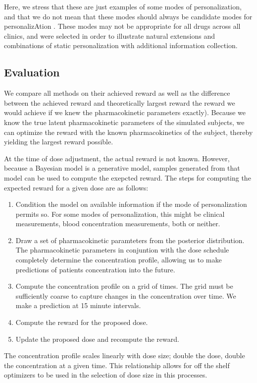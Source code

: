 Here, we stress that these are just examples of some modes of personalization, and that we do not mean that these modes should always be candidate modes for personalizAtion .  These modes may not be appropriate for all drugs across all clinics, and were selected in order to illustrate natural extensions and combinations of static personalization with additional information collection.

\subsection{Evaluation}

We compare all methods on their achieved reward as well as the difference between the achieved reward and theoretically largest reward the reward we would achieve if we knew the pharmacokinetic parameters exactly).  Because we know the true latent pharmacokinetic parameters of the simulated subjects, we can optimize the reward with the known pharmacokinetics of the subject, thereby yielding the largest reward possible.

At the time of dose adjustment, the actual reward is not known.  However, because a Bayesian model is a generative model, samples generated from that model can be used to compute the exepcted reward.  The steps for computing the expected reward for a given dose are as follows:

\begin{enumerate}
	\item Condition the model on available information if the mode of personalization permits so.  For some modes of personalization, this might be clinical measurements, blood concentration measurements, both or neither.
	
	\item Draw a set of pharmacokinetic paramteters from the posterior distribution. The pharmacokinetic parameters in conjuntion with the dose schedule completely determine the concentration profile, allowing us to make predictions of patients concentration into the future.
	
	\item Compute the concentration profile on a grid of times.  The grid must be sufficiently coarse to capture changes in the concentration over time.  We make a prediction at 15 minute intervals.
	
	\item Compute the reward for the proposed dose.
	
	\item Update the proposed dose and recompute the reward.
\end{enumerate}

The concentration profile scales linearly with dose size; double the dose, double the concentration at a given time.  This relationship allows for off the shelf optimizers to be used in the selection of dose size in this processes.
